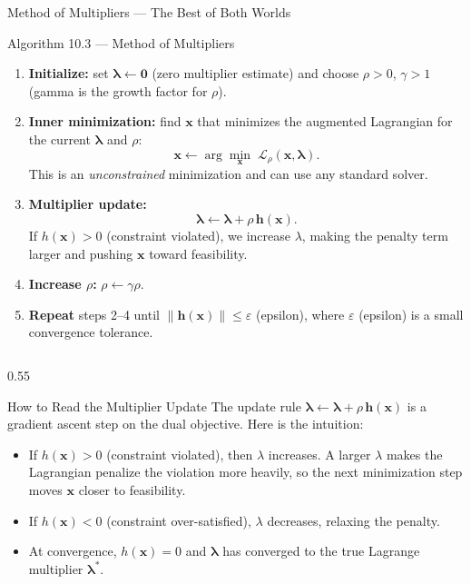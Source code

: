 \documentclass[aspectratio=169,10pt]{beamer}
\newcommand{\bx}{\mathbf{x}}
\newcommand{\blambda}{\bm{\lambda}}
\newcommand{\Lagr}{\mathcal{L}}
\begin{document}
\begin{frame}[allowframebreaks]{Method of Multipliers --- The Best of Both Worlds}
  \framebreak

  \begin{block}{Algorithm 10.3 --- Method of Multipliers}
    \begin{enumerate}
      \item \textbf{Initialize:} set $\blambda \leftarrow \mathbf{0}$ (zero
            multiplier estimate) and choose $\rho > 0$, $\gamma > 1$ (gamma
            is the growth factor for $\rho$).
      \item \textbf{Inner minimization:} find $\bx$ that minimizes the
            augmented Lagrangian for the current $\blambda$ and $\rho$:
            \[
              \bx \leftarrow \arg\min_{\bx}\;\Lagr_\rho(\bx, \blambda).
            \]
            This is an \emph{unconstrained} minimization and can use any
            standard solver.
      \item \textbf{Multiplier update:}
            \[
              \blambda \leftarrow \blambda + \rho\,\mathbf{h}(\bx).
            \]
            If $h(\bx) > 0$ (constraint violated), we increase $\lambda$, making
            the penalty term larger and pushing $\bx$ toward feasibility.
      \item \textbf{Increase $\rho$:} $\rho \leftarrow \gamma\rho$.
      \item \textbf{Repeat} steps 2--4 until $\|\mathbf{h}(\bx)\| \le \varepsilon$
            (epsilon), where $\varepsilon$ (epsilon) is a small convergence
            tolerance.
    \end{enumerate}
  \end{block}

  \framebreak

  \begin{columns}
    \begin{column}{0.55\textwidth}
      \begin{alertblock}{How to Read the Multiplier Update}
        The update rule $\blambda \leftarrow \blambda + \rho\,\mathbf{h}(\bx)$
        is a gradient ascent step on the dual objective.  Here is the intuition:

        \begin{itemize}
          \item If $h(\bx) > 0$ (constraint violated), then $\lambda$ increases.
                A larger $\lambda$ makes the Lagrangian penalize the violation
                more heavily, so the next minimization step moves $\bx$ closer
                to feasibility.
          \item If $h(\bx) < 0$ (constraint over-satisfied), $\lambda$ decreases,
                relaxing the penalty.
          \item At convergence, $h(\bx) = 0$ and $\blambda$ has converged to
                the true Lagrange multiplier $\blambda^*$.
        \end{itemize}


\end{alertblock}
\end{column}
\end{columns}
\end{frame}
\end{document}
